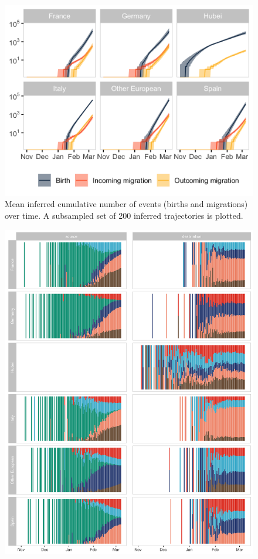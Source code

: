 \documentclass[12pt,]{article}
\begin{document}
\begin{figure}[ht]
    \centering
    \includegraphics[width=\textwidth]{201014_europe2_figtraj06.png}
    \caption{Mean inferred cumulative number of events (births and migrations) over time. A subsampled set of 200 inferred trajectories is plotted.}
    \label{fig:events}
\end{figure}

\begin{figure}[ht]
    \centering
    \includegraphics[width=\textwidth]{201014_europe2_figtraj07.png}
    \caption{}
    \label{fig:migs_srcdest}
\end{figure}
\end{document}
